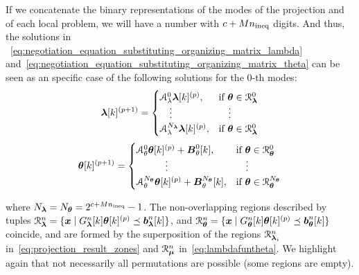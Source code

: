 \documentclass[../main.tex]{subfiles}
\begin{document}
If we concatenate the binary representations of the modes of the projection and of each local problem, we will have a number with $c+Mn_{\text{ineq}}$ digits.
And thus, the solutions in ~\eqref{eq:negotiation_equation_substituting_organizing_matrix_lambda} and~\eqref{eq:negotiation_equation_substituting_organizing_matrix_theta} can be seen as an specific case of the following solutions for the $0$-th modes:
\begin{equation}
  \label{eq:negotiation_equation_substituting_organizing_matrix_lambda_switched}
  \vec{\lambda}[k]\pplusone=
  \begin{cases}
    \mathcal{A}_{\lambda}^{0}\vec{\lambda}[k]\p,&\text{if}\ \vec{\theta} \in \set{R}_{\vec{\lambda}}^{0}\\
    \quad\vdots&\quad\vdots\\
    \mathcal{A}_{\lambda}^{N_{\vec{\lambda}}}\vec{\lambda}[k]\p,&\text{if}\ \vec{\theta}\in\set{R}_{\vec{\lambda}}^{0}\\
  \end{cases}
\end{equation}
\begin{equation}
  \label{eq:negotiation_equation_substituting_organizing_matrix_theta_switched}
  \vec{\theta}[k]\pplusone=
  \begin{cases}
    \mathcal{A}_{\theta}^{0}\vec{\theta}[k]\p+\mathcal{\vec{B}}_{\theta}^{0}[k],&\text{if}\ \vec{\theta}\in\set{R}_{\vec{\theta}}^{0}\\
    \qquad\quad \vdots&\quad \vdots\\
    \mathcal{A}_{\theta}^{N_{\vec{\theta}}}\vec{\theta}[k]\p+\mathcal{\vec{B}}_{\theta}^{N_{\vec{\theta}}}[k],&\text{if}\ \vec{\theta}\in\set{R}_{\vec{\theta}}^{N_{\vec{\theta}}}\\
  \end{cases}
\end{equation}

where $N_{\boldsymbol{\lambda}}=N_{\boldsymbol{\theta}}=2^{c+Mn_{\text{ineq}}}-1$.
The non-overlapping regions described by tuples
 ${\mathcal{R}_{\boldsymbol{\lambda}}^{n}=\{\boldsymbol{x}\mid G_{\boldsymbol{\lambda}}^{n}[k]\boldsymbol{\theta}[k]^{(p)} \preceq \boldsymbol{b}_{\boldsymbol{\lambda}}^{n}[k]\}}$, and
 ${\mathcal{R}_{\boldsymbol{\theta}}^{n}=\{\boldsymbol{x}\mid G_{\boldsymbol{\theta}}^{n}[k]\boldsymbol{\theta}[k]^{(p)} \preceq \boldsymbol{b}_{\boldsymbol{\theta}}^{n}[k]\}}$
coincide, and are formed by the superposition of the regions $\mathcal{R}_{\boldsymbol{\lambda}_i}^{n}$ in~\eqref{eq:projection_result_zones} and $\mathcal{R}_{\boldsymbol{\mu}}^{n}$ in~\eqref{eq:lambdafuntheta}.
We highlight again that not necessarily all permutations are possible (some regions are empty).
\end{document}
